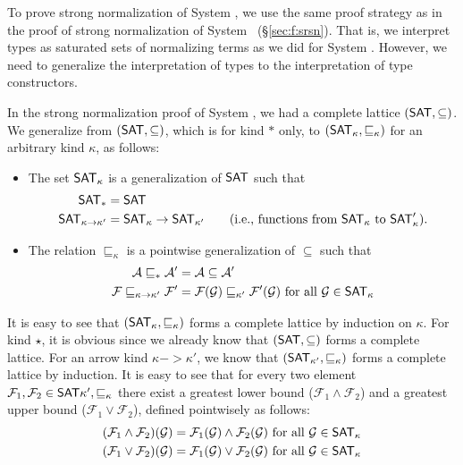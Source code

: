 To prove strong normalization of System \F, we use the same proof strategy
as in the proof of strong normalization of System \F\ (\S\ref{sec:f:srsn}).
That is, we interpret types as saturated sets of normalizing terms as we did
for System \F. However, we need to generalize the interpretation of types to
the interpretation of type constructors.

In the strong normalization proof of
System \F, we had a complete lattice $(\mathsf{SAT},\subseteq)$. We generalize from
$(\mathsf{SAT},\subseteq)$, which is for kind $*$ only, to
$(\mathsf{SAT}_\kappa,\sqsubseteq_\kappa)$ for an arbitrary kind $\kappa$,
as follows:
\begin{itemize}
\item The set $\mathsf{SAT}_\kappa$ is a generalization of $\mathsf{SAT}$ such that
\begin{align*}
        \mathsf{SAT}_{*} &= \mathsf{SAT} \\
        \mathsf{SAT}_{\kappa -> \kappa'} &= \mathsf{SAT}_\kappa -> \mathsf{SAT}_{\kappa'}
        \qquad \text{({i.e.}, functions from $\mathsf{SAT}_\kappa$ to $\mathsf{SAT}_\kappa'$)}.
\end{align*}

\item The relation $\sqsubseteq_\kappa$ is
        a pointwise generalization of $\subseteq$ such that
\begin{align*}
\mathcal{A} \sqsubseteq_{*} \mathcal{A'} &= \mathcal{A} \subseteq \mathcal{A'}\\
\mathcal{F} \sqsubseteq_{\kappa -> \kappa'} \mathcal{F'} &=
        \mathcal{F}(\mathcal{G}) \sqsubseteq_{\kappa'} \mathcal{F'}(\mathcal{G})
        ~\text{for all}~\mathcal{G}\in\mathsf{SAT}_\kappa
\end{align*}
\end{itemize}
It is easy to see that $(\mathsf{SAT}_\kappa,\sqsubseteq_\kappa)$ forms
a complete lattice by induction on $\kappa$. For kind $\star$,
it is obvious since we already know that $(\mathsf{SAT},\subseteq)$ forms
a complete lattice. For an arrow kind $\kappa -> \kappa'$, we know that
$(\mathsf{SAT}_{\kappa'},\sqsubseteq_{\kappa})$ forms a complete lattice by induction.
It is easy to see that for every two element $\mathcal{F}_1, \mathcal{F}_2
\in \mathsf{SAT}{\kappa'},\sqsubseteq_{\kappa}$ there exist a greatest lower bound
($\mathcal{F}_1 \wedge \mathcal{F}_2$) and a greatest upper bound 
($\mathcal{F}_1 \vee \mathcal{F}_2$), defined pointwisely as follows:
\begin{align*}
(\mathcal{F}_1 \wedge \mathcal{F}_2)(\mathcal{G}) &=
   \mathcal{F}_1(\mathcal{G}) \wedge \mathcal{F}_2(\mathcal{G})
        ~\text{for all}~\mathcal{G}\in\mathsf{SAT}_\kappa \\
(\mathcal{F}_1 \vee \mathcal{F}_2)(\mathcal{G}) &=
   \mathcal{F}_1(\mathcal{G}) \vee \mathcal{F}_2(\mathcal{G})
        ~\text{for all}~\mathcal{G}\in\mathsf{SAT}_\kappa
\end{align*}
